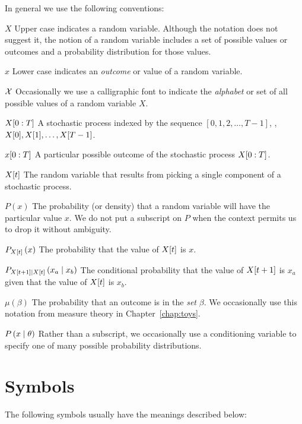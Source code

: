 \documentclass[ltxbook,showlabels, commentsvisible]{hmmdsbook}
\begin{document}
{  In general we use the following conventions:
  \begin{symbdescription}
  \item[$X$] Upper case indicates a random variable.  Although the
    notation does not suggest it, the notion of a random variable
    includes a set of possible values or outcomes and a probability
    distribution for those values.
  \item[$x$] Lower case indicates an \emph{outcome} or value of a
    random variable.
  \item[${\cal X}$] Occasionally we use a calligraphic font to
    indicate the \emph{alphabet} or set of all possible values of a
    random variable $X$.
  \item[$X[0:T]$] A stochastic process indexed by the sequence
    $[0,1,2,\ldots,T-1]$, \ie,\\
    ${X}{[0]},{X}{[1]}, \ldots, {X}{[T-1]}$.
  \item[$x[0:T]$] A particular possible outcome of the stochastic
    process $X[0:T]$.
  \item[${X}{[t]}$] The random variable that results from picking a
    single component of a stochastic process.
  \item[$P(x)$] The probability (or density) that a random variable
    will have the particular value $x$.  We do not put a subscript on
    $P$ when the context permits us to drop it without ambiguity.
  \item[$P_{{X}{[t]}} \left(x \right)$] The probability that the
    value of ${X}{[t]}$ is $x$.
  \item[$P_{{X}{[t+1]}\mid {X}{[t]}} \left(x_a\mid x_b \right)$] The
    conditional probability that the value of ${X}{[t+1]}$ is $x_a$
    given that the value of ${X}{[t]}$ is $x_b$.
  \item[$\mu(\beta)$] The probability that an outcome is in the
    \emph{set} $\beta$.  We occasionally use this notation from
    measure theory in Chapter~\ref{chap:toys}.
  \item[$P \left(x\mid \theta \right)$] Rather than a subscript, we
    occasionally use a conditioning variable to specify one of many
    possible probability distributions.
 \end{symbdescription}

  \section*{Symbols}
  The following symbols usually have the meanings described below:
}
\cleardoublepage%
\markboth{\nomname}{\nomname}%
\printnomenclature
\end{document}

